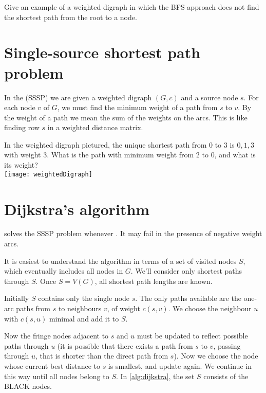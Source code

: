 \begin{Boxample}[6]
Give an example of a weighted digraph in which the BFS approach
does not find the shortest path from the root to a node.
\end{Boxample}

\section{Single-source shortest path problem} \label{sec:SSSP}
\begin{Definition}
In  the  (SSSP) 
we are given a weighted digraph $(G, c)$ and a source node $s$. 
For each node $v$ of $G$, we must find the minimum weight of a path from $s$ to $v$.
By the weight of a path we mean the sum of the weights on the arcs. 
This is like finding row $s$ in a weighted distance matrix.
\end{Definition}

\begin{Boxample} \label{eg:SSSP}
In the weighted digraph pictured, the unique shortest path from $0$ to $3$ is $0, 1, 3$ with weight $3$.
What is the path with minimum weight from $2$ to $0$, and what is its weight?\\

\texttt{[image: weightedDigraph]}
\end{Boxample}

\section{Dijkstra's algorithm}
 solves the SSSP problem whenever . 
It may fail in the presence of negative weight arcs.

It is easiest to understand the algorithm in terms of a set of visited nodes $S$, which eventually includes all nodes in $G$. 
We'll consider only shortest paths through $S$.%
Once $S = V(G)$, all shortest path lengths are known. 

Initially $S$ contains only the single node $s$. 
The only paths available are the one-arc paths from $s$ to neighbours $v$, of weight $c(s, v)$. 
We choose the neighbour $u$ with $c(s, u)$ minimal and add it to $S$. 

Now the fringe nodes adjacent to $s$ and $u$ must be updated to reflect possible paths through $u$ 
(it is possible that there exists a path from $s$ to $v$, passing through $u$, that is shorter than the direct path from $s$). 
Now we choose the node whose current best distance to $s$ is smallest, and update again. 
We continue in this way until all nodes belong to $S$. In \cref{alg:dijkstra}, the set $S$ consists of the BLACK nodes.

